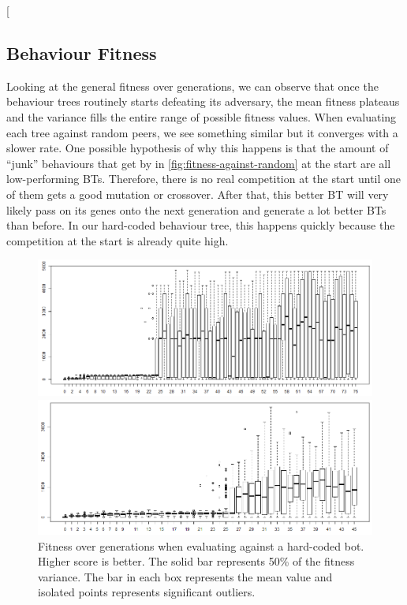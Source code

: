 \documentclass[a4paper, twocolumn]{article}
\begin{document}
        \twocolumn[{
        \subsection{Behaviour Fitness} \label{sec:behaviour_fitness}
        Looking at the general fitness over generations, we can observe that once the behaviour trees routinely starts defeating its adversary, the mean fitness plateaus and the variance fills the entire range of possible fitness values. When evaluating each tree against random peers, we see something similar but it converges with a slower rate. One possible hypothesis of why this happens is that the amount of ``junk'' behaviours that get by in \cref{fig:fitness-against-random} at the start are all low-performing BTs. Therefore, there is no real competition at the start until one of them gets a good mutation or crossover. After that, this better BT will very likely pass on its genes onto the next generation and generate a lot better BTs than before. In our hard-coded behaviour tree, this happens quickly because the competition at the start is already quite high.
        \vspace{2em}
        \begin{figure}[H]
            \centering
            \begin{minipage}{\textwidth}  
                \includegraphics[width=\textwidth]{share/result-againts-bot.png}
                \caption{Fitness over generations when evaluating against a hard-coded bot. Higher score is better. The solid bar represents 50\% of the fitness variance. The bar in each box represents the mean value and isolated points represents significant outliers.}
                \label{fig:fitness-against-bot}
            \end{minipage}
            \begin{minipage}{\textwidth}  
                \includegraphics[width=\textwidth]{share/result-random.png}

\end{minipage}
\end{figure}}
\end{document}
